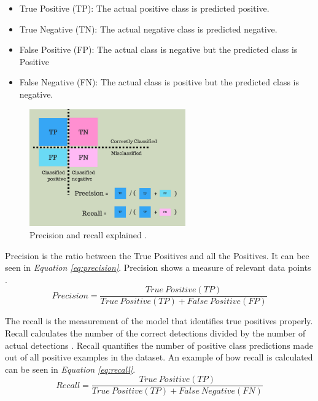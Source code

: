\begin{itemize}
  \item True Positive (TP): The actual positive class is predicted positive.
  \item True Negative (TN): The actual negative class is predicted negative.
  \item False Positive (FP): The actual class is negative but the predicted class is Positive
  \item False Negative (FN): The actual class is positive but the predicted class is negative.
\end{itemize}

\begin{figure}[h]
  \centering
  \includegraphics[width=0.6\textwidth]{graphics/Precisionrecall.png}
  \caption{Precision and recall explained \cite{mittapally_whats_2019}.}
  \label{fig:precisionrecall}
\end{figure}



Precision is the ratio between the True Positives and all the Positives. 
It can bee seen in \textit{Equation \ref{eq:precision}}. Precision shows a measure of relevant data points \cite{shung_accuracy_2018}.
\begin{equation}
  Precision = \frac{True\ Positive(TP)}{True\ Positive(TP)+False \ Positive(FP)}
  \label{eq:precision}
\end{equation}


The recall is the measurement of the model that identifies true positives properly. Recall calculates the number of the correct detections divided by the number of actual detections \cite{shung_accuracy_2018}. Recall quantifies the number of positive class predictions made out of all positive examples in the dataset. An example of how recall is calculated can be seen in \textit{Equation \ref{eq:recall}}.
\begin{equation}
  Recall = \frac{True\ Positive(TP)}{True\ Positive(TP)+False \ Negative(FN)}
  \label{eq:recall}
\end{equation}

